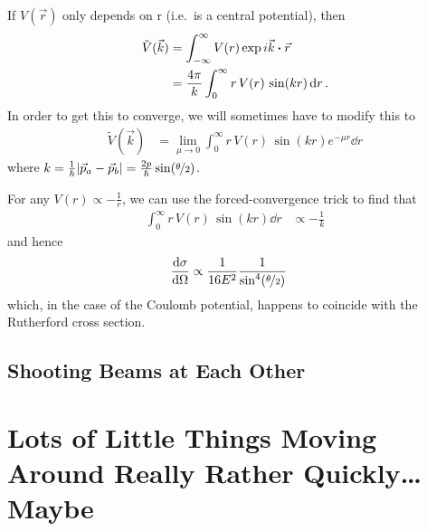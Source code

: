 \documentclass[]{revision-notes}
\begin{document}
If \(V(\vec{r}) \) only depends on r (i.e.~is a central potential), then
\begin{align*}
  \tilde{V}(\vec{k}) &= \int_{-\infty}^{\infty} V(r) \exp i \vec{k}\vdot\vec{r} \\
  &= \frac{4\pi}{k}\int_0^\infty r\,V(r) \,\sin(kr)\dd{r}.
\end{align*}
In order to get this to converge, we will sometimes have to modify this to
\begin{align*}
  \tilde{V}(\vec{k}) &= \lim_{\mu \to 0} \int_0^\infty r\,V(r) \,\sin(kr) e^{-\mu r}\dd{r}
\end{align*}
where \( k = \frac{1}{\hbar} \abs{\vec{p}_a - \vec{p}_b} = \frac{2p}{\hbar}\sin(\nicefrac{\theta}{2}) \).

\begin{example}
  For any \(V(r) \propto -\frac{1}{r}\), we can use the forced-convergence trick to find that
  \begin{align*}
    \int_0^\infty r\,V(r)\,\sin(kr) \dd{r} &\propto -\frac{1}{k}
  \end{align*}
  and hence
  \begin{align*}
    \dv{\sigma}{\Omega} &\propto \frac{1}{16E^2}\frac{1}{\sin^4(\nicefrac{\theta}{2})}
  \end{align*}
  which, in the case of the Coulomb potential, happens to coincide with the Rutherford cross section.
\end{example}

\section{Shooting Beams at Each Other}


\chapter{Lots of Little Things Moving Around Really Rather Quickly\ldots Maybe}


\printbibliography
\end{document}
